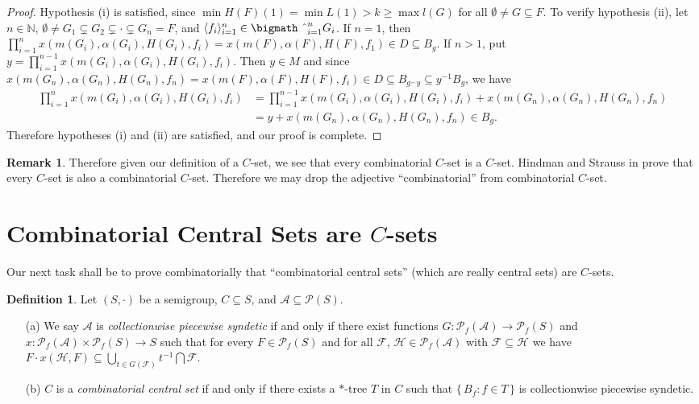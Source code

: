 \documentclass{article}
\theoremstyle{plain}
\theoremstyle{definition}
\newtheorem{defn}[thm]{Definition}
\newtheorem{rmk}[thm]{Remark}
\newcommand{\la}{\langle}
\newcommand{\ra}{\rangle}
\newcommand{\bbN}{\mathbb{N}}
\newcommand{\calA}{\mathcal{A}}
\newcommand{\calF}{\mathcal{F}}
\newcommand{\calH}{\mathcal{H}}
\newcommand{\calP}{\mathcal{P}}
\newcommand{\Pf}{\mathcal{P}_f}
\newcommand{\bigtimes}{\hbox{\bigmath \char'2}}
\begin{document}
\begin{proof}
  Hypothesis (i) is satisfied, since $\min H(F)(1) = \min L(1) > k \ge
  \max l(G)$ for all $\emptyset \ne G \subseteq F$. 
  To verify hypothesis (ii), let $n \in \bbN$, $\emptyset \ne G_1
  \subsetneq G_2 \subsetneq \cdot \subsetneq G_n = F$, and $\la f_i
  \ra_{i=1}^n \in \bigtimes_{i=1}^n G_i$. 
  If $n=1$, then $\prod_{i=1}^n x(m(G_i), \alpha(G_i), H(G_i), f_i) =
  x(m(F), \alpha(F), H(F), f_1) \in D \subseteq B_g$.
  If $n>1$, put $y = \prod_{i=1}^{n-1} x(m(G_i), \alpha(G_i), H(G_i),
  f_i)$.
  Then $y \in M$ and since $x(m(G_n), \alpha(G_n), H(G_n), f_n) =
  x(m(F), \alpha(F), H(F), f_i) \in D \subseteq B_{g^\frown y}
  \subseteq y^{-1}B_g$, we have 
  \begin{align*}
    \prod_{i=1}^n x(m(G_i), \alpha(G_i), H(G_i), f_i) &=
    \prod_{i=1}^{n-1} x(m(G_i), \alpha(G_i), H(G_i), f_i) + x(m(G_n),
    \alpha(G_n), H(G_n), f_n) \\
    &= y + x(m(G_n), \alpha(G_n), H(G_n), f_n) \in B_g.
  \end{align*}
  Therefore hypotheses (i) and (ii) are satisfied, and our proof is
  complete. 
\end{proof}
\begin{rmk}
  Therefore given our definition of a $C$-set, we see that every
  combinatorial $C$-set is a $C$-set. 
  Hindman and Strauss in \cite[Theorem 2.7]{Hindman:2009vn} prove that
  every $C$-set is also a combinatorial $C$-set. 
  Therefore we may drop the adjective ``combinatorial'' from
  combinatorial $C$-set. 
\end{rmk}

\section{Combinatorial Central Sets are $C$-sets}
Our next task shall be to prove combinatorially that ``combinatorial
central sets'' (which are really central sets) are $C$-sets. 
\begin{defn}
  Let $(S, \cdot)$ be a semigroup, $C \subseteq S$, and $\calA
  \subseteq \calP(S)$. 
  \begin{itemize}
    \item[(a)] We say $\calA$ is \textsl{collectionwise piecewise
        syndetic} if and only if there exist functions $G \colon
      \Pf(\calA) \to \Pf(S)$ and $x \colon \Pf(\calA) \times \Pf(S) \to
      S$ such that for every $F \in \Pf(S)$ and for all $\calF$,
      $\calH \in \Pf(\calA)$ with $\calF \subseteq \calH$ we have
      $F \cdot x(\calH, F) \subseteq \bigcup_{t \in G(\calF)}
      t^{-1}\bigcap\calF$.

    \item[(b)] $C$ is a \textsl{combinatorial central set} if and only
      if there exists a \mbox{$*$-tree} $T$ in $C$ such that $\{\, B_f
      : f \in T \,\}$ is collectionwise piecewise syndetic.
  \end{itemize}
\end{defn}
\end{document}
